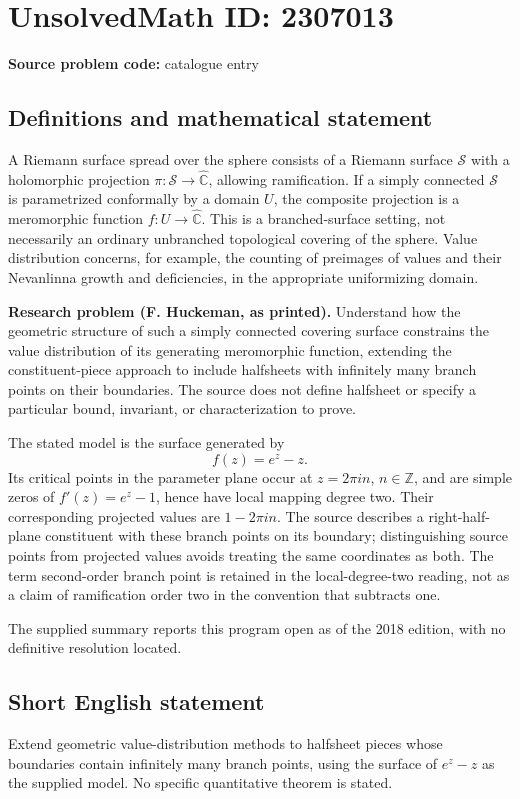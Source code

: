 \documentclass[11pt]{article}
\begin{document}
\section*{UnsolvedMath ID: 2307013}
\textbf{Source problem code:} catalogue entry
\subsection{Definitions and mathematical statement}
A Riemann surface spread over the sphere consists of a Riemann surface $\mathcal S$ with a holomorphic projection $\pi:\mathcal S\to\widehat{\mathbb C}$, allowing ramification. If a simply connected $\mathcal S$ is parametrized conformally by a domain $U$, the composite projection is a meromorphic function $f:U\to\widehat{\mathbb C}$. This is a branched-surface setting, not necessarily an ordinary unbranched topological covering of the sphere. Value distribution concerns, for example, the counting of preimages of values and their Nevanlinna growth and deficiencies, in the appropriate uniformizing domain.

\textbf{Research problem (F. Huckeman, as printed).} Understand how the geometric structure of such a simply connected covering surface constrains the value distribution of its generating meromorphic function, extending the constituent-piece approach to include halfsheets with infinitely many branch points on their boundaries. The source does not define halfsheet or specify a particular bound, invariant, or characterization to prove.

The stated model is the surface generated by
\[
f(z)=e^z-z.
\]
Its critical points in the parameter plane occur at $z=2\pi i n$, $n\in\mathbb Z$, and are simple zeros of $f'(z)=e^z-1$, hence have local mapping degree two. Their corresponding projected values are $1-2\pi i n$. The source describes a right-half-plane constituent with these branch points on its boundary; distinguishing source points from projected values avoids treating the same coordinates as both. The term second-order branch point is retained in the local-degree-two reading, not as a claim of ramification order two in the convention that subtracts one.

The supplied summary reports this program open as of the 2018 edition, with no definitive resolution located.
\subsection{Short English statement}
Extend geometric value-distribution methods to halfsheet pieces whose boundaries contain infinitely many branch points, using the surface of $e^z-z$ as the supplied model. No specific quantitative theorem is stated.
\end{document}
